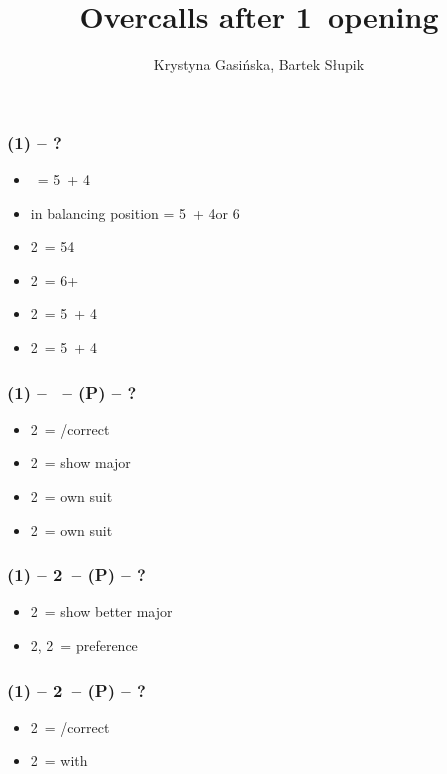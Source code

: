 \documentclass[12pt, a4paper]{article}
\title{Overcalls after 1\ntx\ opening}
\author{Krystyna Gasińska, Bartek Słupik}
\begin{document}
\maketitle


\subsubsection*{(1\ntx) -- ?}
\begin{itemize}
    \item \dbl\ = 5\minor\ + 4\major
    \item \dbl in balancing position = 5\minor\ + 4\major or 6\minor
    \item 2\clubs\ = 54 \major
    \item 2\diams\ = 6+ \major
    \item 2\hearts\ = 5\hearts\ + 4\minor
    \item 2\spades\ = 5\spades\ + 4\minor
\end{itemize}

\subsubsection*{(1\ntx) -- \dbl\ -- (P) -- ?}
\begin{itemize}
    \item 2\clubs\ = \pass/correct
    \item 2\diams\ = show major
    \item 2\hearts\ = own suit
    \item 2\spades\ = own suit
\end{itemize}

\subsubsection*{(1\ntx) -- 2\clubs\ -- (P) -- ?}
\begin{itemize}
    \item 2\diams\ = show better major
    \item 2\hearts, 2\spades\ = preference
\end{itemize}

\subsubsection*{(1\ntx) -- 2\diams\ -- (P) -- ?}
\begin{itemize}
    \item 2\hearts\ = \pass/correct
    \item 2\spades\ = \inv with \hearts
\end{itemize}

\end{document}
